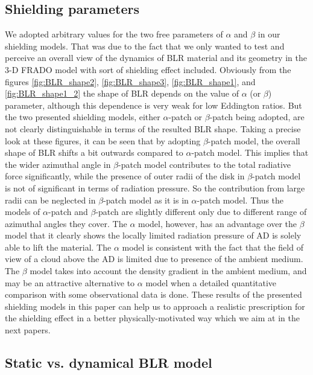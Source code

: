 \documentclass[twocolumn]{aastex62}
\begin{document}
\subsection{Shielding parameters}

We adopted arbitrary values for the two free parameters of $\alpha$ and $\beta$ in our shielding models. That was due to the fact that we only wanted to test and perceive an overall view of the dynamics of BLR material and its geometry in the 3-D FRADO model with sort of shielding effect included. Obviously from the figures \ref{fig:BLR_shape2}, \ref{fig:BLR_shape3},  \ref{fig:BLR_shape1}, and \ref{fig:BLR_shape1_2} the shape of BLR depends on the value of $\alpha$ (or $\beta$) parameter, although this dependence is very weak for low Eddington ratios. But the two presented shielding models, either $\alpha$-patch or $\beta$-patch being adopted, are not clearly distinguishable in terms of the resulted BLR shape. Taking a precise look at these figures, it can be seen that by adopting $\beta$-patch model, the overall shape of BLR shifts a bit outwards compared to $\alpha$-patch model. This implies that the wider azimuthal angle in $\beta$-patch model contributes to the total radiative force significantly, while the presence of outer radii of the disk in $\beta$-patch model is not of significant in terms of radiation pressure. So the contribution from large radii can be neglected in $\beta$-patch model as it is in $\alpha$-patch model. Thus the models of $\alpha$-patch and $\beta$-patch are slightly different only due to different range of azimuthal angles they cover. The $\alpha$ model, however, has an advantage over the $\beta$ model that it clearly shows the locally limited radiation pressure of AD is solely able to lift the material. The $\alpha$ model is consistent with the fact that the field of view of a cloud above the AD is limited due to presence of the ambient medium. The $\beta$ model takes into account the density gradient in the ambient medium, and may be an attractive alternative to $\alpha$ model when a detailed quantitative comparison with some observational data is done.
These results of the presented shielding models in this paper can help us to approach a realistic prescription for the shielding effect in a better physically-motivated way which we aim at in the next papers.

\subsection{Static vs. dynamical BLR model}
\end{document}
